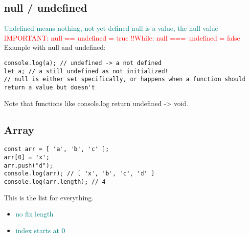 \documentclass[main.tex,fontsize=6pt,paper=a4,paper=landscape,DIV=calc,]{scrartcl}
\begin{document}
\begin{multicols*}{4}
\subsection{null / undefined}  
\textcolor{teal}{Undefined means nothing, not yet defined}\newline
\textcolor{teal}{null is a value, the null value}\newline
\textcolor{red}{IMPORTANT: null == undefined = true !!\newline While: null === undefined = false}\newline
Example with null and undefined:
\vspace{-2mm}
\begin{lstlisting}
console.log(a); // undefined -> a not defined
let a; // a still undefined as not initialized!
// null is either set specifically, or happens when a function should return a value but doesn't
\end{lstlisting}
\vspace{2mm}
Note that functions like console.log return undefined -> void.


\subsection{Array}  
\vspace{-2mm}
\begin{lstlisting}
const arr = [ 'a', 'b', 'c' ];
arr[0] = 'x';
arr.push("d");
console.log(arr); // [ 'x', 'b', 'c', 'd' ]
console.log(arr.length); // 4
\end{lstlisting}
\vspace{2mm}
This is the list for everything.\newline
\begin{itemize}
  \item \textcolor{teal}{no fix length}
  \item \textcolor{teal}{index starts at 0}
  

\end{itemize}
\end{multicols*}
\end{document}
